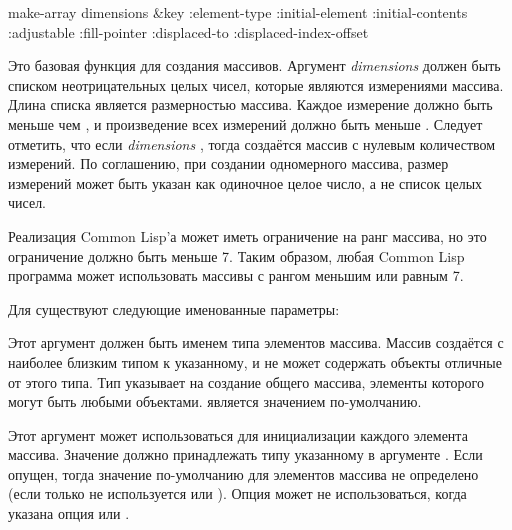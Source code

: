 \begin{defun}[Функция]
make-array dimensions &key :element-type :initial-element :initial-contents :adjustable :fill-pointer :displaced-to :displaced-index-offset

Это базовая функция для создания массивов. Аргумент \emph{dimensions} должен
быть списком неотрицательных целых чисел, которые являются измерениями массива. Длина
списка является размерностью массива. Каждое измерение должно быть меньше чем
, и произведение всех измерений должно быть меньше
.
Следует отметить, что если \emph{dimensions} {\nil}, тогда создаётся массив с
нулевым количеством измерений.
По соглашению, при создании одномерного массива, размер измерений может
быть указан как одиночное целое число, а не список целых чисел.

Реализация Common Lisp'а может иметь ограничение на ранг массива, но это
ограничение должно быть меньше 7. Таким образом, любая Common
Lisp программа может использовать массивы с рангом меньшим или равным 7.

Для  существуют следующие именованные параметры:

\begin{flushdesc}

\item[\cd{:element-type}]
Этот аргумент должен быть именем типа элементов массива.
Массив создаётся с наиболее близким типом к указанному, и не может содержать
объекты отличные от этого типа.
Тип {\true} указывает на создание общего массива, элементы которого могут быть
любыми объектами. {\true} является значением по-умолчанию.

\item[\cd{:initial-element}]
Этот аргумент может использоваться для инициализации каждого элемента
массива. Значение должно принадлежать типу указанному в аргументе
. Если  опущен, тогда значение
по-умолчанию для элементов массива не определено (если только не используется
 или ).
Опция  может не использоваться, когда указана опция
 или .


\end{flushdesc}
\end{defun}
